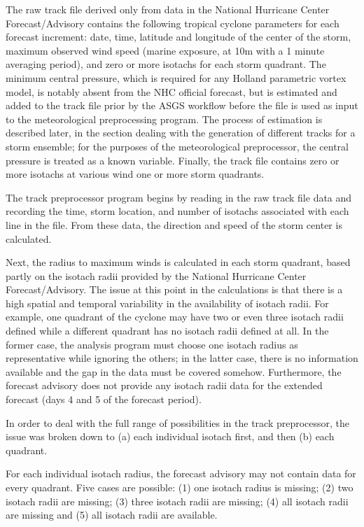 \documentclass[jmse,article,submit,moreauthors,pdftex,12pt,a4paper]{mdpi}
\begin{document}
The raw track file derived only from data in the National Hurricane 
Center Forecast/Advisory contains the following tropical cyclone 
parameters for each forecast increment: date, time, latitude and 
longitude of the center of the storm, maximum observed wind speed 
(marine exposure, at 10m with a 1 minute averaging period), and zero 
or more isotachs for each storm quadrant. The minimum central 
pressure, which is required for any Holland parametric vortex model, 
is notably absent from the NHC official forecast, but is estimated 
and added to the track file prior by the ASGS workflow before the 
file is used as input to the meteorological preprocessing program. 
The process of estimation is described later, in the section dealing 
with the generation of different tracks for a storm ensemble; for 
the purposes of the meteorological preprocessor, the central 
pressure is treated as a known variable. Finally, the track file 
contains zero or more isotachs at various wind one or more storm 
quadrants.

The track preprocessor program begins by reading in the raw track file
data and recording the time, storm location, and number of isotachs
associated with each line in the file. From these data, the direction
and speed of the storm center is calculated.

Next, the radius to maximum winds is calculated in each storm 
quadrant, based partly on the isotach radii provided by the National 
Hurricane Center Forecast/Advisory. The issue at this point in the 
calculations is that there is a high spatial and temporal 
variability in the availability of isotach radii. For example, one 
quadrant of the cyclone may have two or even three isotach radii 
defined while a different quadrant has no isotach radii defined at 
all. In the former case, the analysis program must choose one 
isotach radius as representative while ignoring the others; in the 
latter case, there is no information available and the gap in the 
data must be covered somehow. Furthermore, the forecast advisory
does not provide any isotach radii data for the extended forecast
(days 4 and 5 of the forecast period).

In order to deal with the full range of possibilities in the track 
preprocessor, the issue was broken down to (a) each individual 
isotach first, and then (b) each quadrant. 

For each individual isotach radius, the forecast advisory may not 
contain data for every quadrant. Five cases are possible: (1) one 
isotach radius is missing; (2) two isotach radii are missing; (3) 
three isotach radii are missing; (4) all isotach radii are missing 
and (5) all isotach radii are available. 
\end{document}
